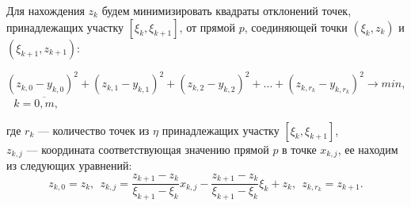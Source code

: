 \documentclass[ignoreonframetext,unicode]{beamer}
\begin{document}



\begin{frame}{}%
	\small
	
	Для нахождения $z_k$ будем минимизировать квадраты отклонений точек, принадлежащих участку  $ [ \xi_k, \xi_{k+1} ] $, от прямой $p$, соединяющей
	точки $ (\xi_k, z_k)$ и $(\xi_{k+1} , z_{k+1})$:
	\vspace*{-2.mm}
	
	\begin{equation}
			(z_{k,0} - y_{k, 0})^2 + (z_{k,1} - y_{k, 1})^2 + (z_{k,2} - y_{k, 2})^2 + \dots + (z_{k, r_k} - y_{k, r_k})^2 \rightarrow min, 
	\label{min_eq}
	\end{equation}
	\,\ $k=\overline{0,m},$
	
	\vspace*{1.mm}
	где $r_k$ --- количество точек из $\eta$ принадлежащих участку  $ [ \xi_k, \xi_{k+1} ]$, \\
	$z_{k,j}$ --- координата соответствующая значению прямой $p$ в точке $x_{k, j}$, ее находим из следующих уравнений:
	\begin{equation*}
		z_{k,0} = z_k, \ \ 
		z_{k,j} = \dfrac{z_{k+1}-z_{k}}{\xi_{k+1} - \xi_k} x_{k, j} -  \dfrac{z_{k+1}-z_{k}}{\xi_{k+1} - \xi_k} \xi_{k} + z_k, \ \ 
		z_{k,r_k} = z_{k+1}.
	\end{equation*}

	
	\normalsize
\end{frame}
\end{document}
